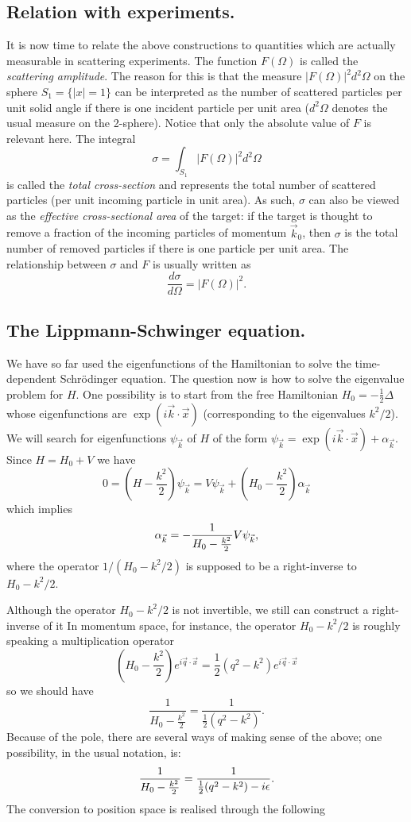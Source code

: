 \documentclass[11pt]{article}
\def\a{\alpha}
\def\e{\epsilon}
\def\s{\sigma}
\def\D{\Delta}
\def\O{\Omega}
\newcommand{\half}{\frac{1}{2}}
\newcommand{\vk}{{\vec{k}}}
\newcommand{\vx}{{\vec{x}}}
\newcommand{\vq}{{\vec{q}}}
\newcommand{\equ}[1]{\begin{equation}{#1}\end{equation}}
\begin{document}
\subsection{\bf Relation with experiments.}
It is now time to relate the above constructions to quantities which are
actually measurable in scattering experiments. The function $F(\O )$ is 
called the {\em scattering amplitude}. The reason for this is that 
the measure $|F(\O )|^2 d^2\O$ on the sphere $S_1=\{ |x|=1 \}$
can be interpreted as the number of scattered particles per unit solid angle
if there is one incident particle per unit area ($d^2 \O $ denotes the
usual measure on the 2-sphere). Notice that only the absolute value of $F$ is
relevant here.
The integral 
\equ{ \s= \int_{S_1} |F(\O )|^2 d^2\O }
is called the {\em total cross-section} and represents the total number
of scattered particles (per unit incoming particle in unit area). As such,
$\s$ can also be viewed as the {\em effective cross-sectional area} of
the target: if the target is thought to remove a fraction of the incoming
particles of momentum $\vk_0$, then $\s$ is the total number of removed
particles if there is one particle per unit area. The relationship
between $\s$ and $F$ is usually written as
\equ{ \frac{d\s}{d\O} = | F( \O )|^2. }


\subsection{\bf The Lippmann-Schwinger equation.}\nopagebreak We have so far
used the eigenfunctions of the Hamiltonian to solve the time-dependent
Schr\"odinger equation. The question now is how to solve the eigenvalue problem
for $H$. One possibility is to start from the free Hamiltonian $H_0= -\half
\D$ whose eigenfunctions are $\exp (i\vk\cdot\vx )$ (corresponding to the
eigenvalues $k^2/2$). We will search for eigenfunctions $\psi_\vk$ of $H$
of the form $\psi_\vk = \exp (i\vk\cdot\vx ) + \a_\vk$. Since $H= H_0 + V$
we have
\equ{ 0=\left( H-\frac{k^2}{2} \right)\psi_\vk = V\psi_\vk +  
\left( H_0 -\frac{k^2}{2} \right) \a_\vk }
which implies
\equ{\label{ls} \a_\vk = -\frac{1}{H_0 -\frac{k^2}{2}} V\psi_\vk , }
where the operator $1/(H_0 - k^2/2 )$ is supposed to be a right-inverse
to $H_0 - k^2/2$.

 Although the operator $H_0 - k^2/2$ is not invertible, we still can 
construct a right-inverse of it
In momentum space, for instance, the operator $H_0 - k^2/2$ is roughly
speaking a multiplication operator
\equ{ \left( H_0 -\frac{k^2}{2} \right) e^{i\vq\cdot\vx} =
\half (q^2 -k^2 )e^{i\vq\cdot\vx} }
so we should have
\equ{ \frac{1}{H_0 -\frac{k^2}{2}}= \frac{1}{\half (q^2 -k^2 )} .}
Because of the pole, there are several ways of making sense of the above;
one possibility, in the usual notation, is:
\equ{\label{inveps}
 \frac{1}{H_0 -\frac{k^2}{2}}= \frac{1}{\half (q^2 -k^2 )-i\e} .}
The conversion to position space is realised through the following
\end{document}
